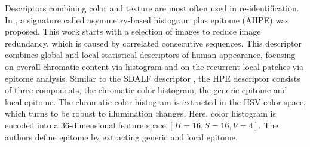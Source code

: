 Descriptors combining color and texture are most often used in re-identification. In \cite{AHPE}, a signature called asymmetry-based histogram plus epitome (AHPE) was proposed. This work starts with a selection of images to reduce image redundancy, which is caused by correlated consecutive sequences. This descriptor combines global and local statistical descriptors of human appearance, focusing on overall chromatic content via histogram and on the recurrent local patches via epitome analysis. Similar to the SDALF descriptor \cite{SDALF}, the HPE descriptor consists of three components, the chromatic color histogram, the generic epitome and local epitome. The chromatic color histogram is extracted in the HSV color space, which turns to be robust to illumination changes. Here, color histogram is encoded into a 36-dimensional feature space $[H=16,  S=16,  V=4]$. The authors define epitome by extracting generic and local epitome. 

